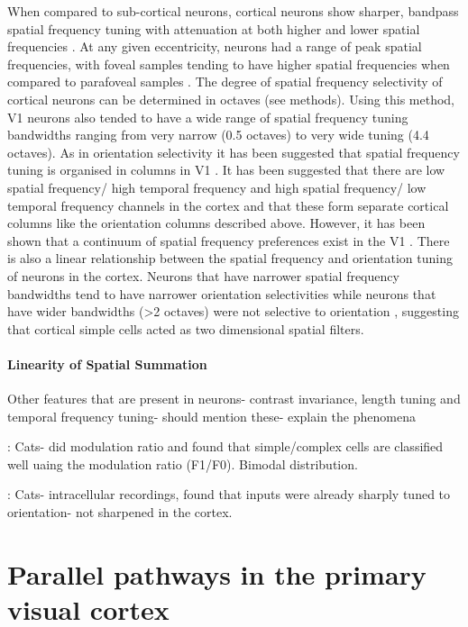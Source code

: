When compared to sub-cortical neurons, cortical neurons show sharper, bandpass spatial frequency tuning with attenuation at both higher and lower spatial frequencies \cite{Maffei1973a, Campbell1969a, Schiller1976a, DeValois1982a, DeValois1990a}. At any given eccentricity, neurons had a range of peak spatial frequencies, with foveal samples tending to have higher spatial frequencies when compared to parafoveal samples \cite{DeValois1982a}. The degree of spatial frequency selectivity of cortical neurons can be determined in octaves (see methods). Using this method, V1 neurons also tended to have a wide range of spatial frequency tuning bandwidths ranging from very narrow (0.5 octaves) to very wide tuning (4.4 octaves). As in orientation selectivity it has been suggested that spatial frequency tuning is organised in columns in V1 \cite{Tootell1981}. It has been suggested that there are low spatial frequency/ high temporal frequency and high spatial frequency/ low temporal frequency channels in the cortex and that these form separate cortical columns like the orientation columns described above. However, it has been shown that a continuum of spatial frequency preferences exist in the V1 \cite{Silverman1989}. There is also a linear relationship between the spatial frequency and orientation tuning of neurons in the cortex. Neurons that have narrower spatial frequency bandwidths tend to have narrower orientation selectivities while neurons that have wider bandwidths (>2 octaves) were not selective to orientation \cite{DeValois1982a, Movshon1978.}, suggesting that cortical simple cells acted as two dimensional spatial filters.




\paragraph{Linearity of Spatial Summation}

Other features that are present in neurons- contrast invariance, length tuning and temporal frequency tuning- should mention these- explain the phenomena

\cite{Skottun1991}: Cats- did modulation ratio and found that simple/complex cells are classified well uaing the modulation ratio (F1/F0). Bimodal distribution.

\cite{Ferster1986}: Cats- intracellular recordings, found that inputs were already sharply tuned to orientation- not sharpened in the cortex. 

\section{Parallel pathways in the primary visual cortex}


